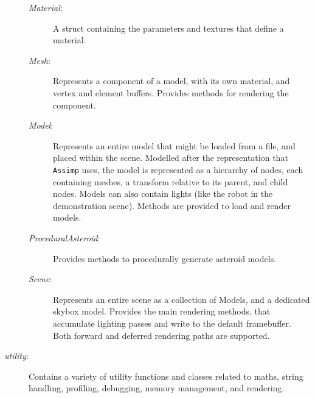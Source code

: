 \documentclass[11pt]{scrartcl} %
\newcommand{\libraryname}[1]{{\texttt{#1}}}
\newcommand{\codefile}[1]{{\textit{#1}}}
\begin{document}
\begin{description}
\begin{description}
                \item[\codefile{Material}:]

                    A struct containing the parameters and textures that define a material.

                \item[\codefile{Mesh}:]

                    Represents a component of a model, with its own material,
                    and vertex and element buffers. Provides methods for
                    rendering the component.

                \item[\codefile{Model}:]

                    Represents an entire model that might be loaded from a
                    file, and placed within the scene. Modelled after the
                    representation that \libraryname{Assimp} uses, the model is
                    represented as a hierarchy of nodes, each containing
                    meshes, a transform relative to its parent, and child
                    nodes. Models can also contain lights (like the robot in
                    the demonstration scene).
                    Methods are provided to load and render models.

                \item[\codefile{ProceduralAsteroid}:]

                    Provides methods to procedurally generate asteroid models.

                \item[\codefile{Scene}:]

                    Represents an entire scene as a collection of Models, and a
                    dedicated skybox model. Provides the main rendering
                    methods, that accumulate lighting passes and write to the
                    default framebuffer. Both forward and deferred rendering
                    paths are supported.

            \end{description}

        \item[\codefile{utility}:]

            Contains a variety of utility functions and classes related to
            maths, string handling, profiling, debugging, memory
            management, and rendering.

    \end{description}
\end{document}
